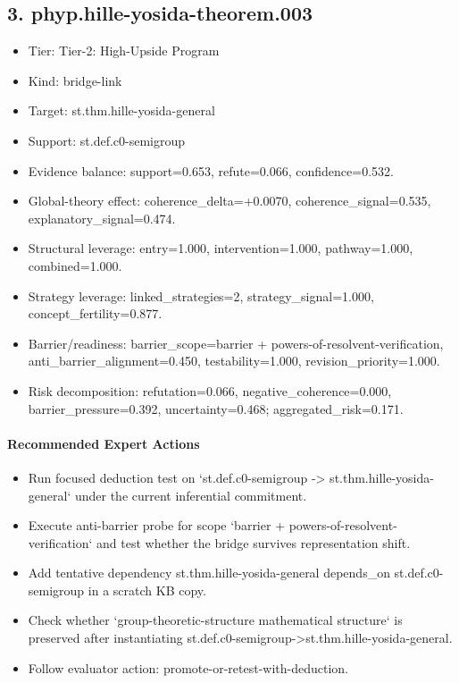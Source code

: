 \documentclass[11pt]{article}
\begin{document}
\subsection*{3. phyp.hille-yosida-theorem.003}
\begin{itemize}
\item Tier: Tier-2: High-Upside Program
\item Kind: bridge-link
\item Target: st.thm.hille-yosida-general
\item Support: st.def.c0-semigroup
\item Evidence balance: support=0.653, refute=0.066, confidence=0.532.
\item Global-theory effect: coherence\_delta=+0.0070, coherence\_signal=0.535, explanatory\_signal=0.474.
\item Structural leverage: entry=1.000, intervention=1.000, pathway=1.000, combined=1.000.
\item Strategy leverage: linked\_strategies=2, strategy\_signal=1.000, concept\_fertility=0.877.
\item Barrier/readiness: barrier\_scope=barrier + powers-of-resolvent-verification, anti\_barrier\_alignment=0.450, testability=1.000, revision\_priority=1.000.
\item Risk decomposition: refutation=0.066, negative\_coherence=0.000, barrier\_pressure=0.392, uncertainty=0.468; aggregated\_risk=0.171.
\end{itemize}
\paragraph{Recommended Expert Actions}
\begin{itemize}
\item Run focused deduction test on `st.def.c0-semigroup -> st.thm.hille-yosida-general` under the current inferential commitment.
\item Execute anti-barrier probe for scope `barrier + powers-of-resolvent-verification` and test whether the bridge survives representation shift.
\item Add tentative dependency st.thm.hille-yosida-general depends\_on st.def.c0-semigroup in a scratch KB copy.
\item Check whether `group-theoretic-structure mathematical structure` is preserved after instantiating st.def.c0-semigroup->st.thm.hille-yosida-general.
\item Follow evaluator action: promote-or-retest-with-deduction.
\end{itemize}
\end{document}
